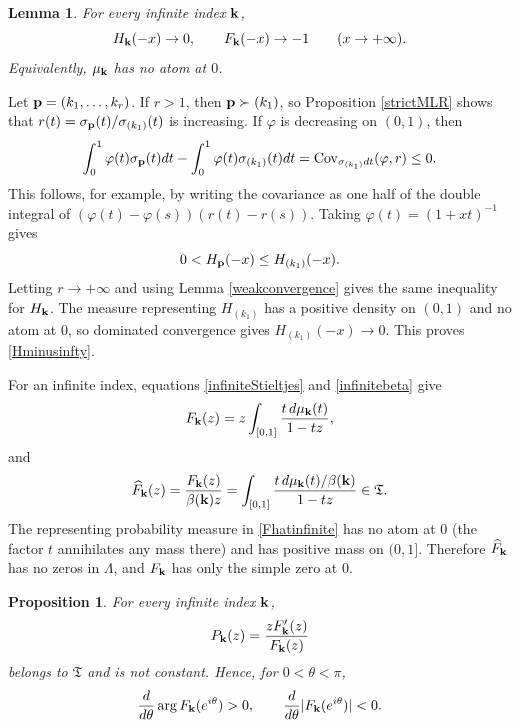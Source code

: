 \documentclass[12pt,a4paper]{amsart}
\makeatletter
\numberwithin{equation}{section}
\renewenvironment{proof}[1][Proof]{%
  \par\pushQED{\qed}%
  \normalfont\topsep6\p@\@plus6\p@\relax
  \trivlist
  \item[\hskip\labelsep\bfseries #1:]\ignorespaces
}{%
  \popQED\endtrivlist\@endpefalse
}
\theoremstyle{plain}
\newtheorem{lem}[Thm]{Lemma}
\newtheorem{prop}[Thm]{Proposition}
\theoremstyle{definition}
\makeatother
\begin{document}
\begin{lem}\label{noatomzero}
For every infinite index ${\bf k}$,
\begin{equation}\label{Hminusinfty}
H_{\bf k}(-x)\rightarrow 0,
\qquad
F_{\bf k}(-x)\rightarrow-1
\qquad(x\rightarrow+\infty).
\end{equation}
Equivalently, $\mu_{\bf k}$ has no atom at $0$.
\end{lem}

\begin{proof}
Let ${\bf p}=(k_1,\ldots,k_r)$.  If $r>1$, then ${\bf p}\succ(k_1)$, so Proposition \ref{strictMLR} shows that
$r(t)=\sigma_{\bf p}(t)/\sigma_{(k_1)}(t)$ is increasing.  If $\varphi$ is decreasing on $(0,1)$, then
\[
\int_0^1\varphi(t)\sigma_{\bf p}(t)dt
-\int_0^1\varphi(t)\sigma_{(k_1)}(t)dt
=\mathrm{Cov}_{\sigma_{(k_1)}dt}(\varphi,r)\leq 0.
\]
This follows, for example, by writing the covariance as one half of the double integral of
$(\varphi(t)-\varphi(s))(r(t)-r(s))$.
Taking $\varphi(t)=(1+xt)^{-1}$ gives
\[
0<H_{\bf p}(-x)\leq H_{(k_1)}(-x).
\]
Letting $r\rightarrow+\infty$ and using Lemma \ref{weakconvergence} gives the same inequality for $H_{\bf k}$.  The measure representing $H_{(k_1)}$ has a positive density on $(0,1)$ and no atom at $0$, so dominated convergence gives
$H_{(k_1)}(-x)\rightarrow0$.  This proves \eqref{Hminusinfty}.
\end{proof}

For an infinite index, equations \eqref{infiniteStieltjes} and \eqref{infinitebeta} give
\begin{equation}\label{Finfiniteint}
F_{\bf k}(z)
=z\int_{[0,1]}\frac{t\,d\mu_{\bf k}(t)}{1-tz},
\end{equation}
and
\begin{equation}\label{Fhatinfinite}
\widehat F_{\bf k}(z)
=\frac{F_{\bf k}(z)}{\beta({\bf k})z}
=\int_{[0,1]}\frac{t\,d\mu_{\bf k}(t)/\beta({\bf k})}{1-tz}
\in\mathfrak{T}.
\end{equation}
The representing probability measure in \eqref{Fhatinfinite} has no atom at $0$ (the factor $t$ annihilates any mass there) and has positive mass on $(0,1]$.  Therefore $\widehat F_{\bf k}$ has no zeros in $\Lambda$, and $F_{\bf k}$ has only the simple zero at $0$.

\begin{prop}\label{infiniteP}
For every infinite index ${\bf k}$,
\[
P_{\bf k}(z)=\frac{zF_{\bf k}'(z)}{F_{\bf k}(z)}
\]
belongs to $\mathfrak{T}$ and is not constant.  Hence, for $0<\theta<\pi$,
\begin{equation}\label{infiniteSelf}
\frac{d}{d\theta}\arg F_{\bf k}(e^{i\theta})>0,
\qquad
\frac{d}{d\theta}|F_{\bf k}(e^{i\theta})|<0.
\end{equation}
\end{prop}
\end{document}
